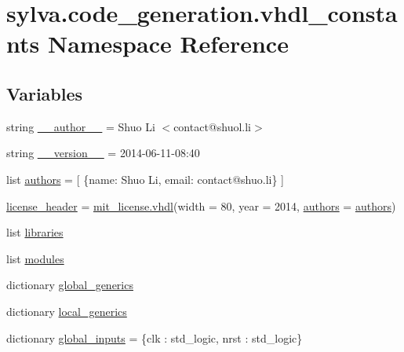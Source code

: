 \hypertarget{namespacesylva_1_1code__generation_1_1vhdl__constants}{}\section{sylva.\+code\+\_\+generation.\+vhdl\+\_\+constants Namespace Reference}
\label{namespacesylva_1_1code__generation_1_1vhdl__constants}
\subsection*{Variables}
\begin{DoxyCompactItemize}
\item 
string \hyperlink{namespacesylva_1_1code__generation_1_1vhdl__constants_a3a21cf548ee3c1e03c9bc1a29d30a9f6}{\+\_\+\+\_\+author\+\_\+\+\_\+} = \textquotesingle{}Shuo Li $<$contact@shuol.\+li$>$\textquotesingle{}
\item 
string \hyperlink{namespacesylva_1_1code__generation_1_1vhdl__constants_a12958e440dcff629230a573882516431}{\+\_\+\+\_\+version\+\_\+\+\_\+} = \textquotesingle{}2014-\/06-\/11-\/08\+:40\textquotesingle{}
\item 
list \hyperlink{namespacesylva_1_1code__generation_1_1vhdl__constants_a72f8afbb7160fba2099c3cfce5067148}{authors} = \mbox{[} \{\textquotesingle{}name\textquotesingle{}\+: \textquotesingle{}Shuo Li\textquotesingle{}, \textquotesingle{}email\textquotesingle{}\+: \textquotesingle{}contact@shuo.\+li\textquotesingle{}\} \mbox{]}
\item 
\hyperlink{namespacesylva_1_1code__generation_1_1vhdl__constants_ad0e5d8620095de8853528edb9034213b}{license\+\_\+header} = \hyperlink{namespacesylva_1_1code__generation_1_1mit__license_a5c8d9ae3b2d4db392cdc66e37b035675}{mit\+\_\+license.\+vhdl}(width = 80, year = 2014, \hyperlink{namespacesylva_1_1code__generation_1_1vhdl__constants_a72f8afbb7160fba2099c3cfce5067148}{authors} = \hyperlink{namespacesylva_1_1code__generation_1_1vhdl__constants_a72f8afbb7160fba2099c3cfce5067148}{authors})
\item 
list \hyperlink{namespacesylva_1_1code__generation_1_1vhdl__constants_a6b47384758c5b2066861e519ce2e20a3}{libraries}
\item 
list \hyperlink{namespacesylva_1_1code__generation_1_1vhdl__constants_a3e666173c3556509eef03cd2ef567ba1}{modules}
\item 
dictionary \hyperlink{namespacesylva_1_1code__generation_1_1vhdl__constants_ac7c713d1ce70d2a383d55a7b6dcc1d84}{global\+\_\+generics}
\item 
dictionary \hyperlink{namespacesylva_1_1code__generation_1_1vhdl__constants_a6f7d7c9bc3eb45cb64276fe779c52d83}{local\+\_\+generics}
\item 
dictionary \hyperlink{namespacesylva_1_1code__generation_1_1vhdl__constants_a83a5ed403384932f0e71834c21ce6971}{global\+\_\+inputs} = \{\textquotesingle{}clk\textquotesingle{} \+: \textquotesingle{}std\+\_\+logic\textquotesingle{}, \textquotesingle{}nrst\textquotesingle{} \+: \textquotesingle{}std\+\_\+logic\textquotesingle{}\}
\end{DoxyCompactItemize}


